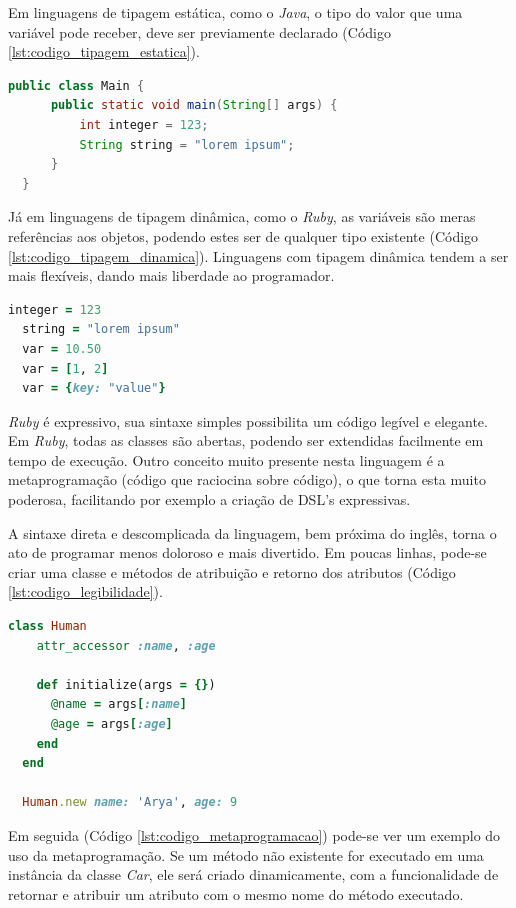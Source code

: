 Em linguagens de tipagem estática, como o \textit{Java}, o tipo do valor que uma variável pode receber, deve ser previamente declarado (Código \ref{lst:codigo_tipagem_estatica}).

{\singlespace
\begin{lstlisting}[caption=Tipagem estática no \textit{Java}, language=Java, label={lst:codigo_tipagem_estatica}]
  public class Main {
      public static void main(String[] args) {
          int integer = 123;
          String string = "lorem ipsum";
      }
  }
\end{lstlisting}
}

Já em linguagens de tipagem dinâmica, como o \textit{Ruby}, as variáveis são meras referências aos objetos, podendo estes ser de qualquer tipo existente (Código \ref{lst:codigo_tipagem_dinamica}). Linguagens com tipagem dinâmica tendem a ser mais flexíveis, dando mais liberdade ao programador.

{\singlespace
\begin{lstlisting}[caption=Tipagem dinâmica no \textit{Ruby}, language=Ruby, label={lst:codigo_tipagem_dinamica}]
  integer = 123
  string = "lorem ipsum"
  var = 10.50
  var = [1, 2]
  var = {key: "value"}
\end{lstlisting}
}

\textit{Ruby} é expressivo, sua sintaxe simples possibilita um código legível e elegante. Em \textit{Ruby}, todas as classes são abertas, podendo ser extendidas facilmente em tempo de execução. Outro conceito muito presente nesta linguagem é a metaprogramação (código que raciocina sobre código), o que torna esta muito poderosa, facilitando por exemplo a criação de DSL’s expressivas.

A sintaxe direta e descomplicada da linguagem, bem próxima do inglês, torna o ato de programar menos doloroso e mais divertido. Em poucas linhas, pode-se criar uma classe e métodos de atribuição e retorno dos atributos (Código \ref{lst:codigo_legibilidade}).

{\singlespace
\begin{lstlisting}[caption=Exemplo de legibilidade em código \textit{Ruby}, language=Ruby, label={lst:codigo_legibilidade}]
  class Human
    attr_accessor :name, :age

    def initialize(args = {})
      @name = args[:name]
      @age = args[:age]
    end
  end

  Human.new name: 'Arya', age: 9
\end{lstlisting}
}

Em seguida (Código \ref{lst:codigo_metaprogramacao}) pode-se ver um exemplo do uso da metaprogramação. Se um método não existente for executado em uma instância da classe \textit{Car}, ele será criado dinamicamente, com a funcionalidade de retornar e atribuir um atributo com o mesmo nome do método executado.

